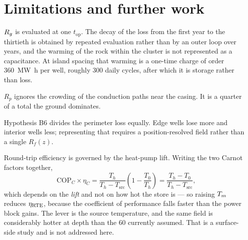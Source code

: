 \section{Limitations and further work}

\begin{description}[leftmargin=2.2em,style=nextline]
\item[Single field age.] $R_{g}$ is evaluated at one $t_{\mathrm{op}}$. The
decay of the loss from the first year to the thirtieth is obtained by repeated
evaluation rather than by an outer loop over years, and the warming of the
rock within the cluster is not represented as a capacitance. At island spacing
that warming is a one-time charge of order \SI{360}{\mega\watt\hour} per well,
roughly 300 daily cycles, after which it is storage rather than loss.
\item[The near-well resistance.] $R_p$ ignores the crowding of the conduction
paths near the casing. It is a quarter of a total the ground dominates.
\item[Uniform cluster.] Hypothesis B6 divides the perimeter loss equally. Edge
wells lose more and interior wells less; representing that requires a
position-resolved field rather than a single $R_f(z)$.
\item[The surface machinery is frozen.] Round-trip efficiency is governed by
the heat-pump lift. Writing the two Carnot factors together,
\begin{equation}
\mathrm{COP}_C \times \eta_C
 = \frac{T_h}{T_h - T_{\mathrm{src}}}\left(1 - \frac{T_0}{T_h}\right)
 = \frac{T_h - T_0}{T_h - T_{\mathrm{src}}},
\end{equation}
which depends on the \emph{lift} and not on how hot the store is --- so
raising $T_{m}$ reduces $\eta_{\mathrm{RTE}}$, because the coefficient of performance falls
faster than the power block gains. The lever is the source temperature, and
the same field is considerably hotter at depth than the \SI{60}{\degC}
currently assumed. That is a surface-side study and is not addressed here.
\end{description}
